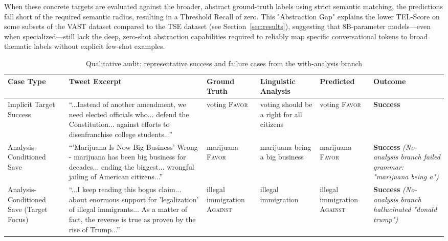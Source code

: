 \documentclass[conference]{IEEEtran}
\begin{document}
When these concrete targets are evaluated against the broader, abstract ground-truth labels using strict semantic matching, the predictions fall short of the required semantic radius, resulting in a Threshold Recall of zero. This "Abstraction Gap" explains the lower TEL-Score on some subsets of the VAST dataset compared to the TSE dataset (see Section~\ref{sec:results}), suggesting that 8B-parameter models—even when specialized—still lack the deep, zero-shot abstraction capabilities required to reliably map specific conversational tokens to broad thematic labels without explicit few-shot examples.


\begin{table}[htbp]
\caption{Qualitative audit: representative success and failure cases from the with-analysis branch}
\label{tab:interpretability_audit}
\centering
\small
\begin{tabular}{|p{}|p{}|p{}|p{}|p{}|p{}|}
\hline
\textbf{Case Type} & \textbf{Tweet Excerpt} & \textbf{Ground Truth} & \textbf{Linguistic Analysis} & \textbf{Predicted} & \textbf{Outcome} \\
\hline
Implicit Target Success & ``...Instead of another amendment, we need elected officials who... defend the Constitution... against efforts to disenfranchise college students...'' & voting \newline \textsc{Favor} & voting should be a right for all citizens & voting \newline \textsc{Favor} & \textbf{Success} \\
\hline
Analysis-Conditioned Save & ``'Marijuana Is Now Big Business' Wrong - marijuana has been big business for decades... ending the biggest... wrongful jailing of American citizens...'' & marijuana \newline \textsc{Favor} & marijuana being a big business & marijuana \newline \textsc{Favor} & \textbf{Success} \newline \textit{(No-analysis branch failed grammar: "marijuana being a")} \\
\hline
Analysis-Conditioned Save (Target Focus) & ``...I keep reading this bogus claim... about enormous support for 'legalization' of illegal immigrants... As a matter of fact, the reverse is true as proven by the rise of Trump...'' & illegal immigration \newline \textsc{Against} & illegal immigration & illegal immigration \newline \textsc{Against} & \textbf{Success} \newline \textit{(No-analysis branch hallucinated "donald trump")} \\

\end{tabular}
\end{table}
\end{document}
